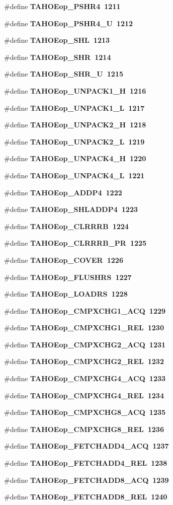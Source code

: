 \begin{CompactItemize}
\#define \bf{TAHOEop\_\-PSHR4}~1211
\item 
\#define \bf{TAHOEop\_\-PSHR4\_\-U}~1212
\item 
\#define \bf{TAHOEop\_\-SHL}~1213
\item 
\#define \bf{TAHOEop\_\-SHR}~1214
\item 
\#define \bf{TAHOEop\_\-SHR\_\-U}~1215
\item 
\#define \bf{TAHOEop\_\-UNPACK1\_\-H}~1216
\item 
\#define \bf{TAHOEop\_\-UNPACK1\_\-L}~1217
\item 
\#define \bf{TAHOEop\_\-UNPACK2\_\-H}~1218
\item 
\#define \bf{TAHOEop\_\-UNPACK2\_\-L}~1219
\item 
\#define \bf{TAHOEop\_\-UNPACK4\_\-H}~1220
\item 
\#define \bf{TAHOEop\_\-UNPACK4\_\-L}~1221
\item 
\#define \bf{TAHOEop\_\-ADDP4}~1222
\item 
\#define \bf{TAHOEop\_\-SHLADDP4}~1223
\item 
\#define \bf{TAHOEop\_\-CLRRRB}~1224
\item 
\#define \bf{TAHOEop\_\-CLRRRB\_\-PR}~1225
\item 
\#define \bf{TAHOEop\_\-COVER}~1226
\item 
\#define \bf{TAHOEop\_\-FLUSHRS}~1227
\item 
\#define \bf{TAHOEop\_\-LOADRS}~1228
\item 
\#define \bf{TAHOEop\_\-CMPXCHG1\_\-ACQ}~1229
\item 
\#define \bf{TAHOEop\_\-CMPXCHG1\_\-REL}~1230
\item 
\#define \bf{TAHOEop\_\-CMPXCHG2\_\-ACQ}~1231
\item 
\#define \bf{TAHOEop\_\-CMPXCHG2\_\-REL}~1232
\item 
\#define \bf{TAHOEop\_\-CMPXCHG4\_\-ACQ}~1233
\item 
\#define \bf{TAHOEop\_\-CMPXCHG4\_\-REL}~1234
\item 
\#define \bf{TAHOEop\_\-CMPXCHG8\_\-ACQ}~1235
\item 
\#define \bf{TAHOEop\_\-CMPXCHG8\_\-REL}~1236
\item 
\#define \bf{TAHOEop\_\-FETCHADD4\_\-ACQ}~1237
\item 
\#define \bf{TAHOEop\_\-FETCHADD4\_\-REL}~1238
\item 
\#define \bf{TAHOEop\_\-FETCHADD8\_\-ACQ}~1239
\item 
\#define \bf{TAHOEop\_\-FETCHADD8\_\-REL}~1240

\end{CompactItemize}

